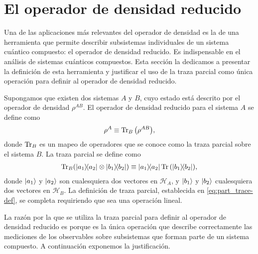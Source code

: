 \section{El operador de densidad reducido} %
Una de las aplicaciones más relevantes del operador de densidad es  
la de una herramienta que permite
describir subsistemas individuales de un sistema
cuántico compuesto: el operador de
densidad reducido. Es indispensable en el 
análisis de sistemas cuánticos compuestos. Esta sección la 
dedicamos a presentar la definición de esta herramienta
y justificar el uso de la traza parcial como única operación
para definir al operador de densidad reducido.

Supongamos que existen dos sistemas $A$ y $B$, cuyo estado está 
descrito por el operador de densidad $\rho^{AB}$. El
operador de densidad reducido para el sistema $A$ se define como
\begin{align}
	\rho^A \equiv \Tr _B\qty(\rho^{AB}),
	\label{eq:partialTrace-def}
\end{align}
donde $\Tr_B$ es un mapeo de operadores que se conoce como
la traza parcial sobre el sistema $B$. La traza parcial
se define como 
\begin{align}
	\Tr_B (\dyad{a_1}{a_2}\otimes \dyad{b_1}{b_2})
	\equiv
	\dyad{a_1}{a_2}\Tr \qty(\dyad{b_1}{b_2}),
	\label{eq:part_trace-def}
\end{align}
donde $\ket{a_1}$ y $\ket{a_2}$ son cualesquiera dos vectores en
$\mathcal{H}_A$, y $\ket{b_1}$ y $\ket{b_2}$ cualesquiera dos vectores
en $\mathcal{H}_B$. La definición de traza parcial, establecida
en \eqref{eq:part_trace-def}, se completa requiriendo que sea 
una operación lineal.


La razón por la que se utiliza la traza parcial para definir al operador
de densidad reducido es porque
es la única operación que describe correctamente 
las mediciones de los observables sobre subsistemas que forman parte de un
sistema compuesto. A continuación exponemos la justificación.

